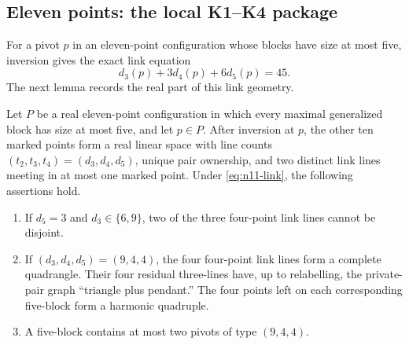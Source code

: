 \subsection{Eleven points: the local K1--K4 package}

For a pivot $p$ in an eleven-point configuration whose blocks have size at
most five, inversion gives the exact link equation
\begin{equation}\label{eq:n11-link}
 d_3(p)+3d_4(p)+6d_5(p)=45.
\end{equation}
The next lemma records the real part of this link geometry.

\begin{lemma}\label{lem:n11-K3}
Let $P$ be a real eleven-point configuration in which every maximal
generalized block has size at most five, and let $p\in P$.  After
inversion at $p$, the other ten marked points form a real linear space with
line counts $(t_2,t_3,t_4)=(d_3,d_4,d_5)$, unique pair ownership, and two
distinct link lines meeting in at most one marked point.  Under
\eqref{eq:n11-link}, the following assertions hold.
\begin{enumerate}[label=\textup{(K3.\arabic*)}]
\item If $d_5=3$ and $d_3\in\{6,9\}$, two of the three four-point link
lines cannot be disjoint.
\item If $(d_3,d_4,d_5)=(9,4,4)$, the four four-point link lines form a
complete quadrangle.  Their four residual three-lines have, up to
relabelling, the private-pair graph ``triangle plus pendant.''  The four
points left on each corresponding five-block form a harmonic quadruple.
\item A five-block contains at most two pivots of type $(9,4,4)$.
\end{enumerate}
\end{lemma}

